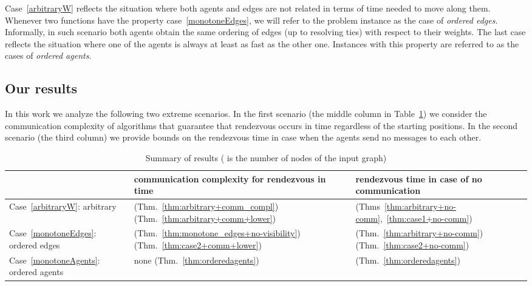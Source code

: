 \documentclass{llncs}
\begin{document}
Case~\ref{arbitraryW} reflects the situation where both agents and edges are not related in terms of time needed to move along them. 
Whenever two functions have the property case~\ref{monotoneEdges}, we will refer to the problem instance as the case of \emph{ordered edges}.
Informally, in such scenario both agents obtain the same ordering of edges (up to resolving ties) with respect to their weights.
The last case reflects the situation where one of the agents is always at least as fast as the other one.
Instances with this property are referred to as the cases of \emph{ordered agents}.

\subsection{Our results}

In this work we analyze the following two extreme scenarios.
In the first scenario (the middle column in Table~\ref{tab:summary}) we consider the communication complexity of algorithms that guarantee that rendezvous occurs in time  regardless of the starting positions.
In the second scenario (the third column) we provide bounds on the rendezvous time in case when the agents send no messages to each other.

\begin{table}[htb]
\begin{center}
\caption{Summary of results ( is the number of nodes of the input graph)}\label{tab:summary}
\begin{tabular}{|p{3.25cm}||p{4.75cm}|p{3.5cm}|} \hline
& communication complexity for \newline
	rendezvous in time 
& rendezvous time in case  \newline
 of no communication \\ \hline\hline

Case~\ref{arbitraryW}: arbitrary &
 (Thm.~\ref{thm:arbitrary+comm_compl}) \newline
 (Thm.~\ref{thm:arbitrary+comm+lower})
 &
 (Thms~\ref{thm:arbitrary+no-comm},~\ref{thm:case1+no-comm})

\\ \hline

Case~\ref{monotoneEdges}: ordered edges &
 (Thm.~\ref{thm:monotone_edges+no-visibility}) \newline
 (Thm.~\ref{thm:case2+comm+lower})
&
 (Thm.~\ref{thm:arbitrary+no-comm}) \newline
 (Thm.~\ref{thm:case2+no-comm})
\\  \hline

Case~\ref{monotoneAgents}: ordered agents
&  none (Thm.~\ref{thm:orderedagents})
&  (Thm.~\ref{thm:orderedagents}) \\ \hline
\end{tabular}
\end{center}
\end{table}
\end{document}
